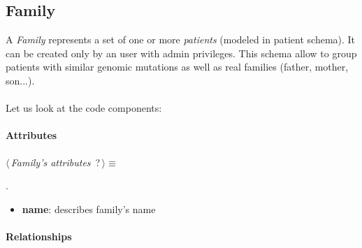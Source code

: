 \subsection{Family}
A \emph{Family} represents a set of one or more \emph{patients} (modeled in patient schema). It can be created only by an user with admin privileges. This schema allow to group patients with similar genomic mutations as well as real families (father, mother, son{...}).
\\
\\Let us look at the code components:

\paragraph{Attributes}      

	\begin{flushleft} \small
\begin{minipage}{\linewidth}\label{scrap18}\raggedright\small
{} $\langle\,${\itshape {Family's attributes}}\nobreak\ {\footnotesize {?}}$\,\rangle\equiv$
\vspace{-1ex}
\begin{list}{}{} \item

                
        {\NWsep}
\end{list}
\vspace{-1.5ex}
\footnotesize
\begin{list}{}{\setlength{\itemsep}{-\parsep}\setlength{\itemindent}{-\leftmargin}}
\item {\NWtxtMacroNoRef}.

\item{}
\end{list}
\end{minipage}\vspace{4ex}
\end{flushleft}
\begin{itemize}
 	\item \textbf{name}: describes family's name
\end{itemize}

\paragraph{Relationships} 

